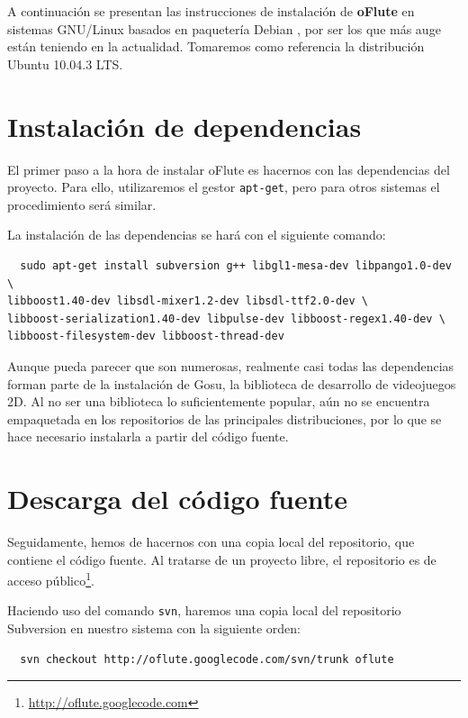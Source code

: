 A continuación se presentan las instrucciones de instalación de \textbf{oFlute}
en sistemas GNU/Linux basados en paquetería Debian , por
ser los que más auge están teniendo en la actualidad. Tomaremos como referencia
la distribución Ubuntu 10.04.3 LTS.

\section{Instalación de dependencias}

El primer paso a la hora de instalar oFlute es hacernos con las dependencias del
proyecto. Para ello, utilizaremos el gestor \texttt{apt-get}, pero para otros
sistemas el procedimiento será similar.

La instalación de las dependencias se hará con el siguiente comando:

\begin{verbatim}
  sudo apt-get install subversion g++ libgl1-mesa-dev libpango1.0-dev \
libboost1.40-dev libsdl-mixer1.2-dev libsdl-ttf2.0-dev \
libboost-serialization1.40-dev libpulse-dev libboost-regex1.40-dev \
libboost-filesystem-dev libboost-thread-dev 
\end{verbatim}

Aunque pueda parecer que son numerosas, realmente casi todas las dependencias
forman parte de la instalación de Gosu, la biblioteca de desarrollo de
videojuegos 2D. Al no ser una biblioteca lo suficientemente popular, aún no se
encuentra empaquetada en los repositorios de las principales distribuciones, por
lo que se hace necesario instalarla a partir del código fuente.

\section{Descarga del código fuente}

Seguidamente, hemos de hacernos con una copia local del repositorio, que
contiene el código fuente. Al tratarse de un proyecto libre, el repositorio es
de acceso público\footnote{\url{http://oflute.googlecode.com}}.

Haciendo uso del comando \texttt{svn}, haremos una copia local del repositorio
Subversion \marginpar{Referencia} en nuestro sistema con la siguiente orden:

\begin{verbatim}
  svn checkout http://oflute.googlecode.com/svn/trunk oflute
\end{verbatim}

